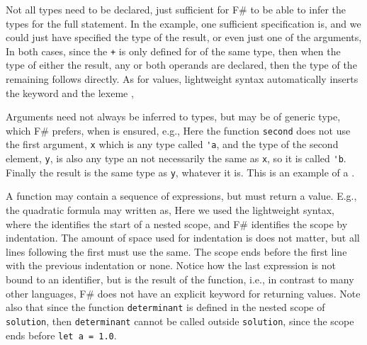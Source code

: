 Not all types need to be declared, just sufficient for F\# to be able to infer the types for the full statement. In the example, one sufficient specification is, and we could just have specified the type of the result,
%
%
or even just one of the arguments,
%
%
In both cases, since the \lstinline|+|  is only defined for  of the same type, then when the type of either the result, any or both operands are declared, then the type of the remaining follows directly.  As for values, lightweight syntax automatically inserts the keyword  and the lexeme \lexeme{;},
%
%

Arguments need not always be inferred to types, but may be of generic type, which F\# prefers, when  is ensured, e.g.,
%
%
Here the function \lstinline{second} does not use the first argument, \lstinline{x} which is any type called \lstinline{'a}, and the type of the second element, \lstinline{y}, is also any type an not necessarily the same as \lstinline!x!, so it is called \lstinline!'b!. Finally the result is the same type as \lstinline!y!, whatever it is. This is an example of a .

A function may contain a sequence of expressions, but must return a value. E.g., the quadratic formula may written as, 
%
%
Here we used the lightweight syntax, where the \lexeme{=} identifies the start of a nested scope, and F\# identifies the scope by indentation. The amount of space used for indentation is does not matter, but all lines following the first must use the same. The scope ends before the first line with the previous indentation or none. Notice how the last expression is not bound to an identifier, but is the result of the function, i.e., in contrast to many other languages, F\# does not have an explicit keyword for returning values. Note also that since the function \lstinline!determinant! is defined in the nested scope of \lstinline!solution!, then  \lstinline!determinant! cannot be called outside \lstinline!solution!, since the scope ends before \lstinline!let a = 1.0!.

